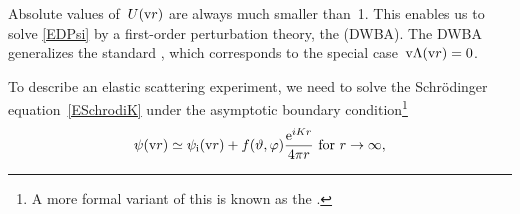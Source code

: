 Absolute values of~$U(\text{v}{r})$ are always much smaller than~1.
This enables us to solve \cref{EDPsi} by a first-order perturbation theory,
%
the  (DWBA).
%
The DWBA generalizes the standard ,
%
which corresponds to the special case~$\text{v}\Lambda(\text{v}{r})=0$.

To describe an elastic scattering experiment,
we need to solve the Schrödinger equation~\cref{ESchrodiK}
under the asymptotic boundary condition\footnote
{A more formal variant of this is known as the .%
%
%
}
%
\begin{equation}\label{Escabouco}
  \psi(\text{v}{r})
  \simeq \psi_{\text{i}}(\text{v}{r}) + f(\vartheta,\varphi)\frac{\mathrm e^{iKr}}{4\pi r}
  \text{~for~}r\to\infty,
\end{equation}
